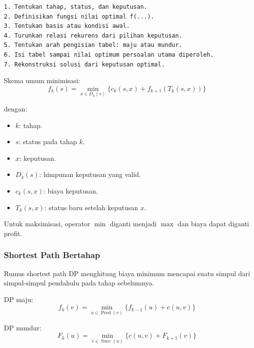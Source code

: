 \begin{lstlisting}[caption={Langkah pengembangan Program Dinamis}, label={lst:langkah-dp}]
1. Tentukan tahap, status, dan keputusan.
2. Definisikan fungsi nilai optimal f(...).
3. Tentukan basis atau kondisi awal.
4. Turunkan relasi rekurens dari pilihan keputusan.
5. Tentukan arah pengisian tabel: maju atau mundur.
6. Isi tabel sampai nilai optimum persoalan utama diperoleh.
7. Rekonstruksi solusi dari keputusan optimal.
\end{lstlisting}

Skema umum minimisasi:
\begin{equation}
    f_k(s)=\min_{x\in D_k(s)}
    \{c_k(s,x)+f_{k+1}(T_k(s,x))\}
    \label{eq:dp-general-min}
\end{equation}

dengan:
\begin{itemize}
    \item $k$: tahap.
    \item $s$: status pada tahap $k$.
    \item $x$: keputusan.
    \item $D_k(s)$: himpunan keputusan yang valid.
    \item $c_k(s,x)$: biaya keputusan.
    \item $T_k(s,x)$: status baru setelah keputusan $x$.
\end{itemize}

Untuk maksimisasi, operator $\min$ diganti menjadi $\max$ dan biaya dapat diganti profit.

\subsubsection{Shortest Path Bertahap}

\begin{jawab}
Rumus shortest path DP menghitung biaya minimum mencapai suatu simpul dari simpul-simpul pendahulu pada tahap sebelumnya.
\end{jawab}

DP maju:
\begin{equation}
    f_k(v)=\min_{u\in \operatorname{Pred}(v)}
    \{f_{k-1}(u)+c(u,v)\}
    \label{eq:dp-shortest-forward}
\end{equation}

DP mundur:
\begin{equation}
    F_k(u)=\min_{v\in \operatorname{Succ}(u)}
    \{c(u,v)+F_{k+1}(v)\}
    \label{eq:dp-shortest-backward}
\end{equation}

